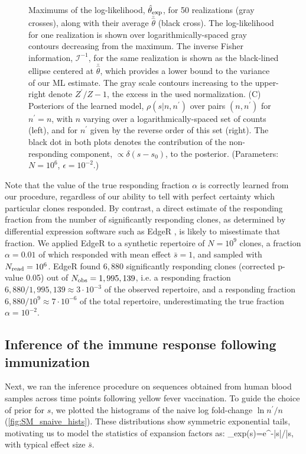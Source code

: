 \begin{figure}
{Maximums of the log-likelihood, $\hat\theta_{\rm exp}$, for 50 realizations (gray crosses), along with their average $\bar{\hat{\theta}}$ (black cross). 
The log-likelihood for one realization is shown over logarithmically-spaced gray contours decreasing from the maximum. 
The inverse Fisher information, $\mathcal{I}^{-1}$, for the same realization is shown as the black-lined ellipse centered at $\bar{\hat{\theta}}$, which provides a lower bound to the variance of our ML estimate. 
The gray scale contours increasing to the upper-right denote $Z^\prime/Z-1$, the excess in the used normalization. (C) Posteriors of the learned model, $\rho(s|n,n^{\prime})$ over pairs $(n,n^{\prime})$ for $n^{\prime}=n$, with $n$ varying over a logarithmically-spaced set of counts (left), and for $n^{\prime}$ given by the reverse order of this set (right). The black dot in both plots denotes the contribution of the non-responding component, $\propto \delta(s-s_0)$, to the posterior.
(Parameters: $N=10^6$, $\epsilon=10^{-2}$.)
\label{fig:diffexpr_ex1}
}
\end{figure}

Note that the value of the true responding fraction $\alpha$ is correctly learned from our procedure, regardless of our ability to tell with perfect certainty which particular clones responded. By contrast, a direct estimate of the responding fraction from the number of significantly responding clones, as determined by differential expression software such as EdgeR \cite{Robinson2010}, is likely to misestimate that fraction. We applied EdgeR to a synthetic repertoire of $N=10^9$ clones, a fraction $\alpha=0.01$ of which responded with mean effect $\bar s=1$, and sampled with $N_{\rm read}=10^6$. EdgeR found $6,880$ significantly responding clones (corrected p-value 0.05) out of $N_{\rm obs}=1,995,139 $, i.e. a responding fraction $6,880/1,995,139 \approx 3\cdot 10^{-3}$ of the observed repertoire, and a responding fraction $6,880/10^9\approx 7\cdot 10^{-6}$ of the total repertoire, underestimating the true fraction $\alpha=10^{-2}$.

\subsection*{Inference of the immune response following immunization} \label{sec:diffexpr}

Next, we ran the inference procedure on sequences obtained from human blood samples across time points following yellow fever vaccination. To guide the choice of prior for $s$, we plotted the histograms of the naive log fold-change $\ln n^{\prime}/n$ (\cref{fig:SM_snaive_hists}). These distributions show symmetric exponential tails, motivating us to model the statistics of expansion factors as:
\beq\label{eq:symmexp}
\rho_{\rm exp}(s)=e^{-|s|/\bar s},
\eeq
with typical effect size $\bar{s}$.


